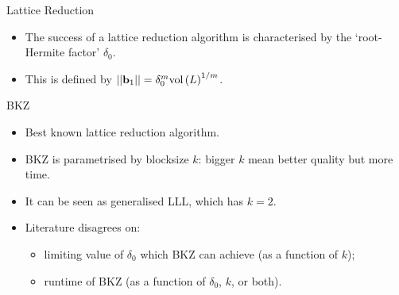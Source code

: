 \documentclass[10pt,compress]{beamer}
\renewcommand{\vec}[1]{\mathbf{#1}\xspace}
\newcommand{\vol}[1]{\ensuremath{\textnormal{vol}\left(#1\right)}\xspace}
\renewcommand{\vec}[1]{\mathbf{#1}\xspace}
\begin{document}
\begin{frame}{Lattice Reduction}
  \begin{itemize}
  \item The success of a lattice reduction algorithm is characterised by the `root-Hermite factor' $\delta_0$. 
  \item This is defined by $||\vec{b}_1|| = \delta_0^m \vol{L}^{1/m}$.
  \end{itemize}

\end{frame}

\begin{frame}{BKZ}
  \begin{itemize}
  \item Best known lattice reduction algorithm.
  \item BKZ is parametrised by blocksize $k$: bigger $k$ mean better quality but more time.
  \item It can be seen as generalised LLL, which has $k=2$. 
  \item Literature disagrees on:
    \begin{itemize}
    \item limiting value of $\delta_0$ which BKZ can achieve (as a function of $k$);
    \item runtime of BKZ (as a function of $\delta_0$, $k$, or both).
    \end{itemize}
  \end{itemize}
\end{frame}
\end{document}
